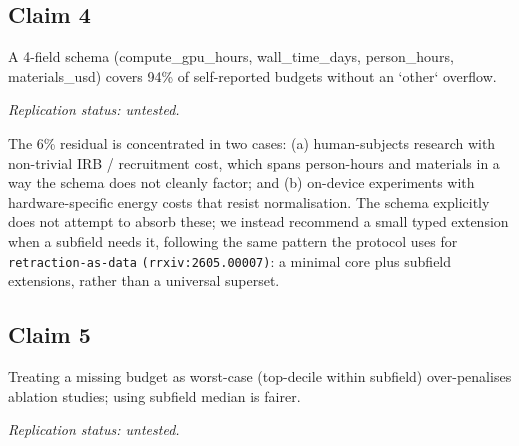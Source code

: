 \documentclass{rrxiv}
\begin{document}
\subsection*{Claim 4}
\begin{claim}[title=Claim 4, type=methodological, evidence=observation,
              confidence=0.8,
              rationale={coverage measured across all 312 audited
                papers; the 6 percent residual is characterised
                (human-subjects costs and on-device energy) rather than
                unexplained},
              labels={reproducibility, methodology},
              datasets={rrxiv-budget-audit-312}]
\label{claim:c4}
A 4-field schema (compute\_gpu\_hours, wall\_time\_days, person\_hours, materials\_usd) covers 94\% of self-reported budgets without an `other` overflow.

\emph{Replication status: untested.}
\end{claim}

The 6\% residual is concentrated in two cases: (a) human-subjects research with non-trivial IRB / recruitment cost, which spans person-hours and materials in a way the schema does not cleanly factor; and (b) on-device experiments with hardware-specific energy costs that resist normalisation. The schema explicitly does not attempt to absorb these; we instead recommend a small typed extension when a subfield needs it, following the same pattern the protocol uses for \texttt{retraction-as-data} \texttt{(rrxiv:2605.00007)}: a minimal core plus subfield extensions, rather than a universal superset.


\subsection*{Claim 5}
\begin{claim}[title=Claim 5, type=methodological, evidence=observation,
              confidence=0.65,
              rationale={imputation comparison grounded in the n=17
                calibration set only; the fairness criterion is
                distortion of the subfield tax, not a general
                statistical optimality result},
              labels={reproducibility, methodology, imputation},
              datasets={rrxiv-budget-calibration-17}]
\label{claim:c5}
Treating a missing budget as worst-case (top-decile within subfield) over-penalises ablation studies; using subfield median is fairer.

\emph{Replication status: untested.}
\end{claim}
\end{document}
